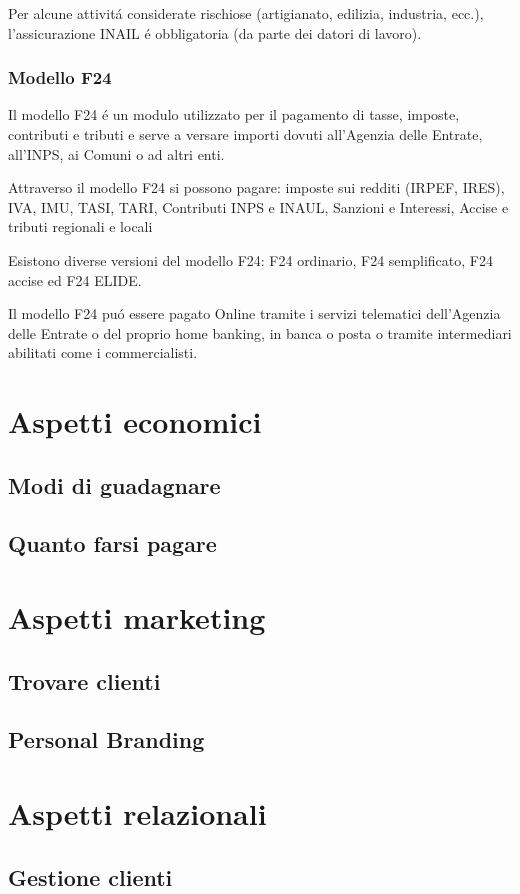 \documentclass{article}
\begin{document}
Per alcune attivit\'a considerate rischiose (artigianato, edilizia, industria, ecc.), l'assicurazione INAIL \'e obbligatoria (da parte dei datori di lavoro).

\subsubsection{Modello F24}
Il modello F24 \'e un modulo utilizzato per il pagamento di tasse, imposte, contributi e tributi e serve a versare importi dovuti all'Agenzia delle Entrate, all'INPS, ai Comuni o ad altri enti. 

Attraverso il modello F24 si possono pagare: imposte sui redditi (IRPEF, IRES), IVA, IMU, TASI, TARI, Contributi INPS e INAUL, Sanzioni e Interessi, Accise e tributi regionali e locali

Esistono diverse versioni del modello F24: F24 ordinario, F24 semplificato, F24 accise ed F24 ELIDE.

Il modello F24 pu\'o essere pagato Online tramite i servizi telematici dell'Agenzia delle Entrate o del proprio home banking, in banca o posta o tramite intermediari abilitati come i commercialisti.

\section{Aspetti economici}
\subsection{Modi di guadagnare}
\subsection{Quanto farsi pagare}

\section{Aspetti marketing}
\subsection{Trovare clienti}
\subsection{Personal Branding}

\section{Aspetti relazionali}
\subsection{Gestione clienti}
\end{document}
